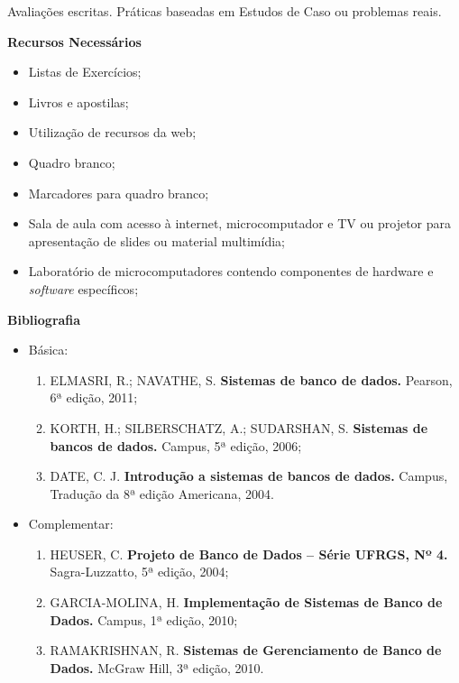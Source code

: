 \noindent
  Avaliações escritas. Práticas baseadas em Estudos de Caso ou problemas reais.

\begin{snugshade}\begin{center}\textbf{
    Recursos Necessários
    \vphantom{q} %
}\end{center}\end{snugshade}

\begin{itemize} 
  \item Listas de Exercícios;
  \item Livros e apostilas;
  \item Utilização de recursos da web;
  \item Quadro branco;
  \item Marcadores para quadro branco;
  \item Sala de aula com acesso à internet, microcomputador e TV ou projetor para apresentação de slides ou material multimídia;
  \item Laboratório de microcomputadores contendo componentes de hardware e \textit{software} específicos;
\end{itemize}


\begin{snugshade}\begin{center}\textbf{
    Bibliografia
}\end{center}\end{snugshade}

\begin{itemize} 
  \item Básica:
	\begin{enumerate}
	\item 	ELMASRI, R.; NAVATHE, S. \textbf{Sistemas de banco de dados.} Pearson, 6ª edição, 2011;
	\item 	KORTH, H.; SILBERSCHATZ, A.; SUDARSHAN, S. \textbf{Sistemas de bancos de dados.} Campus, 5ª edição, 2006;
	\item 	DATE, C. J. \textbf{Introdução a sistemas de bancos de dados.} Campus, Tradução da 8ª edição Americana, 2004.      
	\end{enumerate}
  \item Complementar:
	\begin{enumerate} 
	\item 	HEUSER, C. \textbf{Projeto de Banco de Dados – Série UFRGS, Nº 4.} Sagra-Luzzatto, 5ª edição, 2004;
	\item 	GARCIA-MOLINA, H. \textbf{Implementação de Sistemas de Banco de Dados.} Campus, 1ª edição, 2010;
    \item 	RAMAKRISHNAN, R. \textbf{Sistemas de Gerenciamento de Banco de Dados.} McGraw Hill, 3ª edição, 2010.
	\end{enumerate}
\end{itemize}
